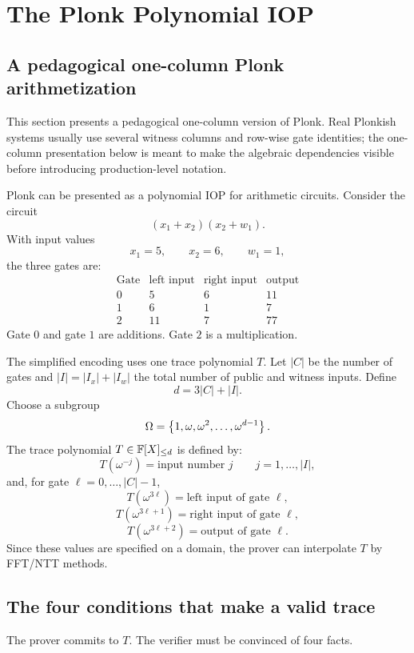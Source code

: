 \section{The Plonk Polynomial IOP}
\label{sec:plonk-iop}

\subsection{A pedagogical one-column Plonk arithmetization}

This section presents a pedagogical one-column version of Plonk. Real Plonkish systems usually use several witness columns and row-wise gate identities; the one-column presentation below is meant to make the algebraic dependencies visible before introducing production-level notation.

Plonk can be presented as a polynomial IOP for arithmetic circuits. Consider the circuit
\[
    (x_1+x_2)(x_2+w_1).
\]
With input values
\[
    x_1=5,
    \qquad
    x_2=6,
    \qquad
    w_1=1,
\]
the three gates are:
\[
\begin{array}{c|ccc}
\text{Gate} & \text{left input} & \text{right input} & \text{output}\\
\hline
0 & 5 & 6 & 11\\
1 & 6 & 1 & 7\\
2 & 11 & 7 & 77
\end{array}
\]
Gate $0$ and gate $1$ are additions. Gate $2$ is a multiplication.

The simplified encoding uses one trace polynomial $T$. Let $|C|$ be the number of gates and $|I|=|I_x|+|I_w|$ the total number of public and witness inputs. Define
\[
    d=3|C|+|I|.
\]
Choose a subgroup
\[
    \Omega=\left\{1,\omega,\omega^2,\ldots,\omega^{d-1}\right\}.
\]
The trace polynomial $T\in\mathbb{F}[X]_{\le d}$ is defined by:
\[
    T(\omega^{-j})=\text{input number }j
    \qquad j=1,\ldots,|I|,
\]
and, for gate $\ell=0,\ldots,|C|-1$,
\[
    T(\omega^{3\ell})=\text{left input of gate }\ell,
\]
\[
    T(\omega^{3\ell+1})=\text{right input of gate }\ell,
\]
\[
    T(\omega^{3\ell+2})=\text{output of gate }\ell.
\]
Since these values are specified on a domain, the prover can interpolate $T$ by FFT/NTT methods.

\subsection{The four conditions that make a valid trace}

The prover commits to $T$. The verifier must be convinced of four facts.

